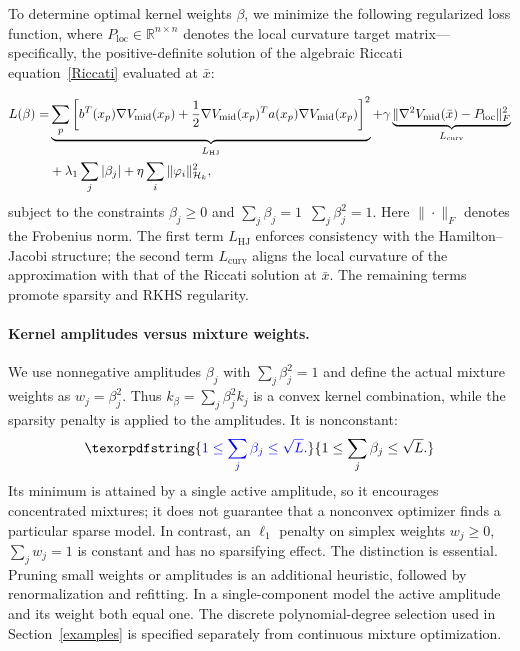 \documentclass[11pt]{article}
\theoremstyle{plain}      %
\theoremstyle{definition} %
\providecommand{\DIFaddtex}[1]{{\protect\color{blue}#1}} %
\providecommand{\DIFdeltex}[1]{{\protect\color{red}#1}} %
\providecommand{\DIFaddbegin}{} %
\providecommand{\DIFaddend}{} %
\providecommand{\DIFdelbegin}{} %
\providecommand{\DIFdelend}{} %
\providecommand{\DIFadd}[1]{\texorpdfstring{\DIFaddtex{#1}}{#1}} %
\providecommand{\DIFdel}[1]{\texorpdfstring{\DIFdeltex{#1}}{}} %
\newcommand{\DIFscaledelfig}{1.0}
\newlength{\DIFdelgraphicswidth} %
\newlength{\DIFdelgraphicsheight} %
\newcommand{\DIFaddincludegraphics}[2][]{{\color{blue}\fbox{\DIFOincludegraphics[#1]{#2}}}} %
\newcommand{\DIFdelincludegraphics}[2][]{%
\sbox{\DIFdelgraphicsbox}{\DIFOincludegraphics[#1]{#2}}%
\settoboxwidth{\DIFdelgraphicswidth}{\DIFdelgraphicsbox} %
\settoboxtotalheight{\DIFdelgraphicsheight}{\DIFdelgraphicsbox} %
\scalebox{\DIFscaledelfig}{%
\parbox[b]{\DIFdelgraphicswidth}{\usebox{\DIFdelgraphicsbox}\\[-\baselineskip] \rule{\DIFdelgraphicswidth}{0em}}\llap{\resizebox{\DIFdelgraphicswidth}{\DIFdelgraphicsheight}{%
\setlength{\unitlength}{\DIFdelgraphicswidth}%
\begin{picture}(1,1)%
\thicklines\linethickness{2pt} %
{\color[rgb]{1,0,0}\put(0,0){\framebox(1,1){}}}%
{\color[rgb]{1,0,0}\put(0,0){\line( 1,1){1}}}%
{\color[rgb]{1,0,0}\put(0,1){\line(1,-1){1}}}%
\end{picture}%
}\hspace*{3pt}}} %
} %
\DeclareRobustCommand{\DIFaddbegin}{\DIFOaddbegin \let\includegraphics\DIFaddincludegraphics} %
\DeclareRobustCommand{\DIFaddend}{\DIFOaddend \let\includegraphics\DIFOincludegraphics} %
\DeclareRobustCommand{\DIFdelbegin}{\DIFOdelbegin \let\includegraphics\DIFdelincludegraphics} %
\DeclareRobustCommand{\DIFdelend}{\DIFOaddend \let\includegraphics\DIFOincludegraphics} %
\begin{document}
To determine optimal kernel weights \( \beta \), we minimize the following regularized loss function, where $P_{\text{loc}} \in \mathbb{R}^{n \times n}$ denotes the local curvature target matrix---specifically, the positive-definite solution of the algebraic Riccati equation~\eqref{Riccati} evaluated at $\bar{x}$:

\begin{align}\label{eq:composite_loss}
L(\beta) = & \underbrace{\sum_p \left[ b^{T}(x_p)\nabla V_{\text{mid}}(x_p) + \frac{1}{2} \nabla V_{\text{mid}}(x_p)^{T}a(x_p)\nabla V_{\text{mid}}(x_p)\right]^2}_{L_{\text{HJ}}}
+ \gamma \underbrace{\|\nabla^2 V_{\text{mid}}(\bar{x}) - P_{\text{loc}}\|_F^2}_{L_{\text{curv}}} \notag \\
& + \lambda_1 \sum_j |\beta_j| + \eta \sum_i \|\varphi_i\|_{\mathcal{H}_k}^2,
\end{align}
subject to the constraints \( \beta_j \ge 0 \) and \DIFdelbegin \DIFdel{\( \sum_j \beta_j = 1 \)}\DIFdelend\ \DIFaddbegin \DIFadd{\( \sum_j \beta_j^2 = 1 \)}\DIFaddend . Here $\| \cdot \|_F$ denotes the Frobenius norm. The first term $L_{\text{HJ}}$ enforces consistency with the Hamilton--Jacobi structure; the second term $L_{\text{curv}}$ aligns the local curvature of the approximation with that of the Riccati solution at $\bar{x}$. The remaining terms promote sparsity and RKHS regularity.

\DIFaddbegin \paragraph{\DIFadd{Kernel amplitudes versus mixture weights.}}\label{sec:amplitudes}
\DIFadd{We use nonnegative amplitudes $\beta_j$ with $\sum_j\beta_j^2=1$ and define the actual mixture weights as $w_j=\beta_j^2$. Thus $k_\beta=\sum_j\beta_j^2k_j$ is a convex kernel combination, while the sparsity penalty is applied to the amplitudes. It is nonconstant:
}\[
 \DIFadd{1\leq\sum_j\beta_j\leq\sqrt L.
}\]
\DIFadd{Its minimum is attained by a single active amplitude, so it encourages concentrated mixtures; it does not guarantee that a nonconvex optimizer finds a particular sparse model. In contrast, an $\ell_1$ penalty on simplex weights $w_j\geq0$, $\sum_jw_j=1$ is constant and has no sparsifying effect. The distinction is essential. Pruning small weights or amplitudes is an additional heuristic, followed by renormalization and refitting. In a single-component model the active amplitude and its weight both equal one. The discrete polynomial-degree selection used in Section~\ref{examples} is specified separately from continuous mixture optimization.
}
\end{document}
